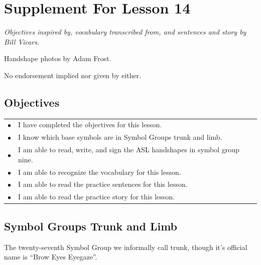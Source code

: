 \documentclass{article}
\begin{document}
\newfontfamily{}
\newfontfamily{}
\newcommand{\bul}{\hfil$\bullet$&}
\renewenvironment{glossary}{\begin{multicols}{5}\begin{center}}{\end{center}\end{multicols}}
\setcounter{secnumdepth}{0}
\setlength{\columnseprule}{1pt}

\section{Supplement For Lesson 14}

\begin{center}
\it
Objectives inspired by, vocabulary transcribed from, and sentences and story by Bill Vicars.

Handshape photos by Adam Frost.

No endorsement implied nor given by either.
\end{center}

\subsection{Objectives}

\begin{tabular}{p{1cm}p{14cm}}
\bul I have completed the objectives for this lesson.\\
\bul I know which base symbols are in Symbol Groups trunk and limb.\\
\bul I am able to read, write, and sign the ASL handshapes in symbol group nine.\\
\bul I am able to recognize the vocabulary for this lesson.\\
\bul I am able to read the practice sentences for this lesson.\\
\bul I am able to read the practice story for this lesson.\\
\end{tabular}

\subsection{Symbol Groups Trunk and Limb}

The twenty-seventh Symbol Group we informally call trunk, though it's official name is ``Brow Eyes Eyegaze''.
\end{document}
